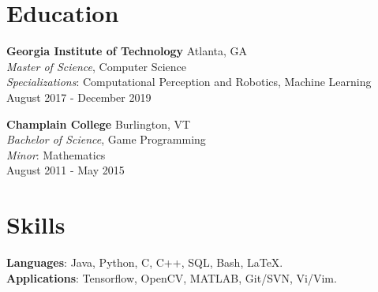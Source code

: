 \documentclass[margin]{res}
\begin{document}
\begin{resume}

\section{Education}
\phantom{spacing}
\par
\textbf{Georgia Institute of Technology} \hfill Atlanta, GA\\
{\sl Master of Science}, Computer Science
\\
{\sl Specializations}: Computational Perception and Robotics, Machine Learning
\\
August 2017 - December 2019

\par
\textbf{Champlain College} \hfill Burlington, VT\\
{\sl Bachelor of Science}, Game Programming
\\
{\sl Minor}: Mathematics
\\
August 2011 - May 2015


\section{Skills}
\phantom{spacing}
\par
\textbf{Languages}: Java, Python, C, C++, SQL, Bash, \LaTeX.
\\
\textbf{Applications}: Tensorflow, OpenCV, MATLAB, Git/SVN, Vi/Vim. 


\end{resume}
\end{document}
